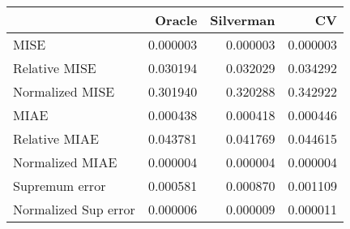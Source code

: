 \begin{tabular}{lrrr}
  \toprule
 & Oracle & Silverman & CV \\ 
  \midrule
MISE & 0.000003 & 0.000003 & 0.000003 \\ 
  Relative MISE & 0.030194 & 0.032029 & 0.034292 \\ 
  Normalized MISE & 0.301940 & 0.320288 & 0.342922 \\ 
  MIAE & 0.000438 & 0.000418 & 0.000446 \\ 
  Relative MIAE & 0.043781 & 0.041769 & 0.044615 \\ 
  Normalized MIAE & 0.000004 & 0.000004 & 0.000004 \\ 
  Supremum error & 0.000581 & 0.000870 & 0.001109 \\ 
  Normalized Sup error & 0.000006 & 0.000009 & 0.000011 \\ 
   \bottomrule
\end{tabular}
